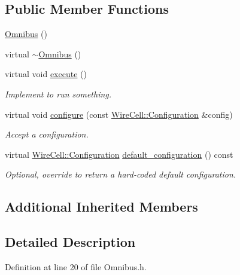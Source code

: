 \subsection*{Public Member Functions}
\begin{DoxyCompactItemize}
\item 
\hyperlink{class_wire_cell_1_1_sig_proc_1_1_omnibus_ac621c33c35779b8a5bbcc56d32111641}{Omnibus} ()
\item 
virtual \hyperlink{class_wire_cell_1_1_sig_proc_1_1_omnibus_ab5c8afbc2887922ee4fcf75c69f26bb6}{$\sim$\+Omnibus} ()
\item 
virtual void \hyperlink{class_wire_cell_1_1_sig_proc_1_1_omnibus_ab79548e4b108f011bfc6dd1dae434804}{execute} ()
\begin{DoxyCompactList}\small\item\em Implement to run something. \end{DoxyCompactList}\item 
virtual void \hyperlink{class_wire_cell_1_1_sig_proc_1_1_omnibus_a7de4c0516e22eecdc350daa74fee594a}{configure} (const \hyperlink{namespace_wire_cell_a9f705541fc1d46c608b3d32c182333ee}{Wire\+Cell\+::\+Configuration} \&config)
\begin{DoxyCompactList}\small\item\em Accept a configuration. \end{DoxyCompactList}\item 
virtual \hyperlink{namespace_wire_cell_a9f705541fc1d46c608b3d32c182333ee}{Wire\+Cell\+::\+Configuration} \hyperlink{class_wire_cell_1_1_sig_proc_1_1_omnibus_a6b55ae0abaf191124c0f778f72f90553}{default\+\_\+configuration} () const
\begin{DoxyCompactList}\small\item\em Optional, override to return a hard-\/coded default configuration. \end{DoxyCompactList}\end{DoxyCompactItemize}
\subsection*{Additional Inherited Members}


\subsection{Detailed Description}


Definition at line 20 of file Omnibus.\+h.



